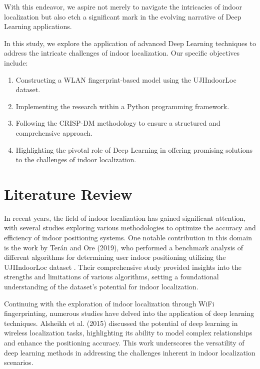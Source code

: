 \documentclass[conference]{IEEEtran}
\begin{document}
With this endeavor, we aspire not merely to navigate the intricacies of indoor localization but also etch a significant mark in the evolving narrative of Deep Learning applications.

In this study, we explore the application of advanced Deep Learning techniques to address the intricate challenges of indoor localization. Our specific objectives include:

\begin{enumerate}
\item Constructing a WLAN fingerprint-based model using the UJIIndoorLoc dataset.
\item Implementing the research within a Python programming framework.
\item Following the CRISP-DM methodology to ensure a structured and comprehensive approach.
\item Highlighting the pivotal role of Deep Learning in offering promising solutions to the challenges of indoor localization.
\end{enumerate}


\section{Literature Review}

In recent years, the field of indoor localization has gained significant attention, with several studies exploring various methodologies to optimize the accuracy and efficiency of indoor positioning systems. One notable contribution in this domain is the work by Terán and Ore (2019), who performed a benchmark analysis of different algorithms for determining user indoor positioning utilizing the UJIIndoorLoc dataset \textcolor{blue}{\cite{teran2019benchmark}}. Their comprehensive study provided insights into the strengths and limitations of various algorithms, setting a foundational understanding of the dataset's potential for indoor localization.

Continuing with the exploration of indoor localization through WiFi fingerprinting, numerous studies have delved into the application of deep learning techniques. Alsheikh et al. (2015) discussed the potential of deep learning in wireless localization tasks, highlighting its ability to model complex relationships and enhance the positioning accuracy\textcolor{blue}{\cite{alsheikh2015deep}}. This work underscores the versatility of deep learning methods in addressing the challenges inherent in indoor localization scenarios.
\end{document}
